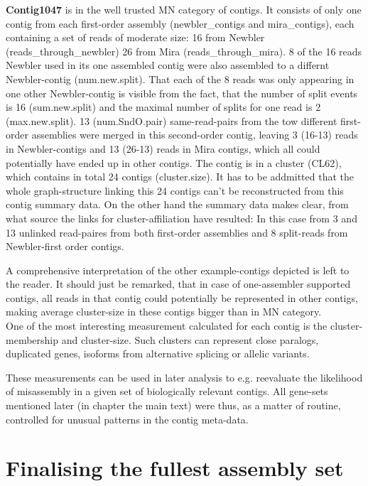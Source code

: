 \documentclass[12pt,a4paper]{article}
\begin{document}
\textbf{Contig1047} is in the well trusted MN category of contigs. It
consists of only one contig from each first-order assembly
(newbler\_contigs and mira\_contigs), each containing a set of reads
of moderate size: 16 from Newbler (reads\_through\_newbler) 26 from
Mira (reads\_through\_mira). 8 of the 16 reads Newbler used in its one
assembled contig were also assembled to a differnt Newbler-contig
(num.new.split). That each of the 8 reads was only appearing in one
other Newbler-contig is visible from the fact, that the number of
split events is 16 (sum.new.split) and the maximal number of splits
for one read is 2 (max.new.split). 13 (num.SndO.pair) same-read-pairs
from the tow different first-order assemblies were merged in this
second-order contig, leaving 3 (16-13) reads in Newbler-contigs and 13
(26-13) reads in Mira contigs, which all could potentially have ended
up in other contigs. The contig is in a cluster (CL62), which contains
in total 24 contigs (cluster.size). It has to be addmitted that the
whole graph-structure linking this 24 contigs can't be reconstructed
from this contig summary data. On the other hand the summary data
makes clear, from what source the links for cluster-affiliation have
resulted: In this case from 3 and 13 unlinked read-paires from both
first-order assemblies and 8 split-reads from Newbler-first order
contigs.

A comprehensive interpretation of the other example-contigs depicted
is left to the reader. It should just be remarked, that in case of
one-assembler supported contigs, all reads in that contig could
potentially be represented in other contigs, making average
cluster-size in these contigs bigger than in MN category.\\

One of the most interesting measurement calculated for each contig is
the cluster-membership and cluster-size. Such clusters can represent
close paralogs, duplicated genes, isoforms from alternative splicing
or allelic variants.

These measurements can be used in later analysis to e.g. reevaluate
the likelihood of misassembly in a given set of biologically relevant
contigs. All gene-sets mentioned later (in chapter the main text) were
thus, as a matter of routine, controlled for unusual patterns in the
contig meta-data.

\section{Finalising the fullest assembly set}
\label{sec:final-full-assembly}
\end{document}
